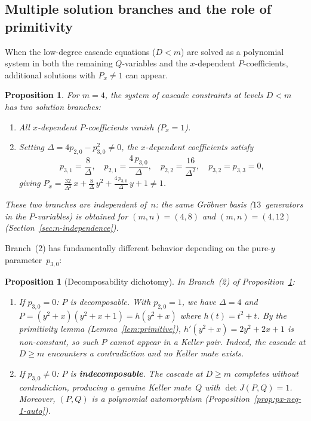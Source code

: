 \documentclass[12pt,a4paper]{article}
\newtheorem{proposition}[theorem]{Proposition}
\theoremstyle{definition}
\begin{document}
\subsection{Multiple solution branches and the role of primitivity}%
\label{sec:spurious}

When the low-degree cascade equations ($D < m$) are solved as a polynomial
system in both the remaining $Q$-variables and the $x$-dependent
$P$-coefficients, additional solutions with $P_x \neq 1$ can appear.

\begin{proposition}\label{prop:spurious}
For $m = 4$, the system of cascade constraints at levels $D < m$
has two solution branches:
\begin{enumerate}
\item[\textup{(1)}] All $x$-dependent $P$-coefficients vanish
  ($P_x = 1$).
\item[\textup{(2)}] Setting $\Delta = 4p_{2,0} - p_{3,0}^2 \neq 0$,
  the $x$-dependent coefficients satisfy
  \begin{equation}\label{eq:branch2}
    p_{3,1} = \frac{8}{\Delta},\quad
    p_{2,1} = \frac{4\,p_{3,0}}{\Delta},\quad
    p_{2,2} = \frac{16}{\Delta^2},\quad
    p_{3,2} = p_{3,3} = 0,
  \end{equation}
  giving $P_x = \tfrac{32}{\Delta^2}\, x + \tfrac{8}{\Delta}\, y^2
  + \tfrac{4\,p_{3,0}}{\Delta}\, y + 1 \neq 1$.
\end{enumerate}
These two branches are independent of~$n$: the same Gr\"obner basis
\textup{(}$13$~generators in the $P$-variables\textup{)} is obtained
for $(m,n) = (4,8)$ and $(m,n) = (4,12)$
\textup{(Section~\ref{sec:n-independence})}.
\end{proposition}

Branch~(2) has fundamentally different behavior depending on the
pure-$y$ parameter~$p_{3,0}$:

\begin{proposition}[Decomposability dichotomy]\label{prop:decomp-dichotomy}
In Branch~\textup{(2)} of Proposition~\textup{\ref{prop:spurious}}:
\begin{enumerate}
\item[\textup{(a)}] If $p_{3,0} = 0$: $P$ is decomposable.
  With $p_{2,0} = 1$, we have $\Delta = 4$ and
  $P = (y^2 + x)(y^2 + x + 1) = h(y^2+x)$ where $h(t) = t^2 + t$.
  By the primitivity lemma (Lemma~\textup{\ref{lem:primitive}}),
  $h'(y^2+x) = 2y^2 + 2x + 1$ is non-constant, so
  such $P$ cannot appear in a Keller pair. Indeed, the cascade
  at $D \geq m$ encounters a contradiction and no Keller mate exists.
\item[\textup{(b)}] If $p_{3,0} \neq 0$: $P$ is \textbf{indecomposable}.
  The cascade at $D \geq m$ completes without contradiction,
  producing a genuine Keller mate~$Q$ with $\det J(P,Q) = 1$.
  Moreover, $(P,Q)$ is a polynomial automorphism
  \textup{(Proposition~\ref{prop:px-neq-1-auto})}.
\end{enumerate}
\end{proposition}
\end{document}
